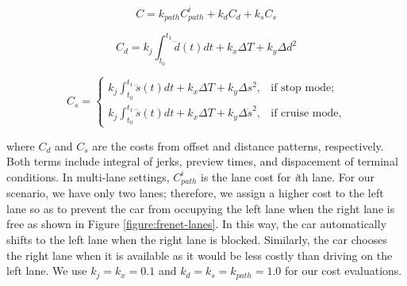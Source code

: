 \begin{equation}
    C = k_{path}C^i_{path} + k_dC_d + k_sC_s
\label{eq:cost1}
\end{equation}

\begin{equation}
    C_d = k_j\int_{t_0}^{t_1}\dddot{d}(t)dt + k_x\Delta T + k_y\Delta d^2
\label{eq:cost2}
\end{equation}

\begin{equation}
    C_s =
    \begin{cases}
        k_j\int_{t_0}^{t_1}\dddot{s}(t)dt + k_x\Delta T + k_y\Delta s^2,
        &\text{if stop mode;} \\
        k_j\int_{t_0}^{t_1}\dddot{s}(t)dt + k_x\Delta T + k_y\Delta \dot{s}^2,
        &\text{if cruise mode,}
    \end{cases}
\label{eq:cost3}
\end{equation}

where $C_d$ and $C_s$ are the costs from offset and distance patterns,
respectively. Both terms include integral of jerks, preview times, and
dispacement of terminal conditions. In multi-lane settings, $C^i_{path}$ is the
lane cost for \textit{i}th lane. For our scenario, we have only two lanes;
therefore, we assign a higher cost to the left lane so as to prevent the car
from occupying the left lane when the right lane is free as shown in Figure
\ref{figure:frenet-lanes}. In this way, the car automatically shifts to the
left lane when the right lane is blocked. Similarly, the car chooses the right
lane when it is available as it would be less costly than driving on the left
lane. We use $k_j = k_x = 0.1$ and $k_d = k_s = k_{path} = 1.0$ for our cost
evaluations.

